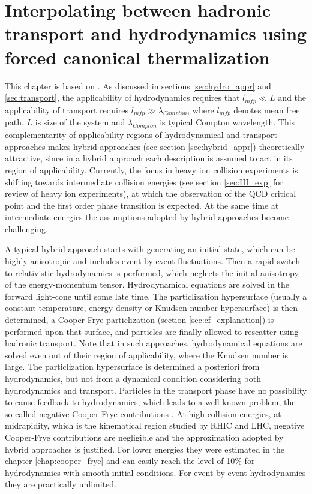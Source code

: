 \chapter{Interpolating between hadronic transport and hydrodynamics using forced canonical thermalization}
\label{chap:forced_therm}

This chapter is based on \cite{Oliinychenko:2016vkg}. As discussed in sections
\ref{sec:hydro_appr} and \ref{sec:transport}, the applicability of
hydrodynamics requires that $l_{mfp} \ll L$ and the applicability of transport
requires $l_{mfp} \gg \lambda_{Compton}$, where $l_{mfp}$ denotes mean free
path, $L$ is size of the system and $\lambda_{Compton}$ is typical Compton
wavelength. This complementarity of applicability regions of hydrodynamical and
transport approaches makes hybrid approaches (see section
\ref{sec:hybrid_appr}) theoretically attractive, since in a hybrid approach
each description is assumed to act in its region of applicability. Currently,
the focus in heavy ion collision experiments is shifting towards intermediate
collision energies (see section \ref{sec:HI_exp} for review of heavy ion
experiments), at which the observation of the QCD critical point and the first
order phase transition is expected. At the same time at intermediate energies
the assumptions adopted by hybrid approaches become challenging.

A typical hybrid approach starts with generating an initial state, which can be
highly anisotropic and includes event-by-event fluctuations. Then a rapid
switch to relativistic hydrodynamics is performed, which neglects the initial
anisotropy of the energy-momentum tensor. Hydrodynamical equations are solved
in the forward light-cone until some late time. The particlization hypersurface
(usually a constant temperature, energy density or Knudsen number hypersurface)
is then determined, a Cooper-Frye particlization (section
\ref{sec:cf_explanation}) is performed upon that surface, and particles are
finally allowed to rescatter using hadronic transport. Note that in such
approaches, hydrodynamical equations are solved even out of their region of
applicability, where the Knudsen number is large. The particlization
hypersurface is determined a posteriori from hydrodynamics, but not from a
dynamical condition considering both hydrodynamics and transport. Particles in
the transport phase have no possibility to cause feedback to hydrodynamics,
which leads to a well-known problem, the so-called negative Cooper-Frye
contributions
\cite{Bugaev:1996zq,Bugaev:1999wz,Anderlik:1998cb,Oliinychenko:2014tqa}. At
high collision energies, at midrapidity, which is the kinematical region
studied by RHIC and LHC, negative Cooper-Frye contributions are negligible and
the approximation adopted by hybrid approaches is justified. For lower energies
they were estimated in the chapter \ref{chap:cooper_frye} and can easily reach
the level of 10\% for hydrodynamics with smooth initial conditions. For
event-by-event hydrodynamics they are practically unlimited.

